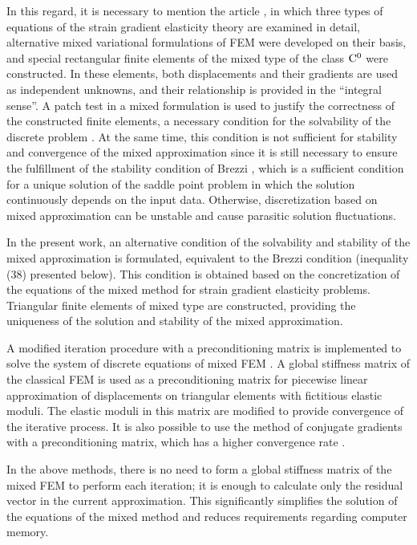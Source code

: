 In this regard, it is necessary to mention the article \cite{Chirkov28}, in which three types of equations of the strain gradient elasticity theory are examined in detail, alternative mixed variational formulations of FEM were developed on their basis, and special rectangular finite elements of the mixed type of the class $\rm C^0$ were constructed. In these elements, both displacements and their gradients are used as independent unknowns, and their relationship is provided in the ``integral sense''. A patch test in a mixed formulation is used to justify the correctness of the constructed finite elements, a necessary condition for the solvability of the discrete problem \cite{Chirkov52}. At the same time, this condition is not sufficient for stability and convergence of the mixed approximation since it is still necessary to ensure the fulfillment of the stability condition of Brezzi \cite{Chirkov58}, which is a sufficient condition for a unique solution of the saddle point problem in which the solution continuously depends on the input data. Otherwise, discretization based on mixed approximation can be unstable and cause parasitic solution fluctuations.

In the present work, an alternative condition of the solvability and stability of the mixed approximation is formulated, equivalent to the Brezzi condition (inequality (38) presented below). This condition is obtained based on the concretization of the equations of the mixed method for strain gradient elasticity problems. Triangular finite elements of mixed type are constructed, providing the uniqueness of the solution and stability of the mixed approximation.

A modified iteration procedure with a preconditioning matrix is implemented to solve the system of discrete equations of mixed FEM \cite{Chirkov38}. A global stiffness matrix of the classical FEM is used as a preconditioning matrix for piecewise linear approximation of displacements on triangular elements with fictitious elastic moduli. The elastic moduli in this matrix are modified to provide convergence of the iterative process. It is also possible to use the method of conjugate gradients with a preconditioning matrix, which has a higher convergence rate \cite{Chirkov59, Chirkov60}. 

In the above methods, there is no need to form a global stiffness matrix of the mixed FEM to perform each iteration; it is enough to calculate only the residual vector in the current approximation. This significantly simplifies the solution of the equations of the mixed method and reduces requirements regarding computer memory.

